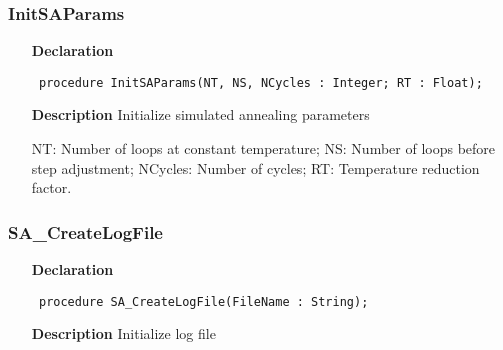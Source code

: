 \documentclass[12pt,a4paper,oneside]{report}
\newcommand{\declarationitem}[1]{\textbf{#1}}
\newcommand{\descriptiontitle}[1]{\textbf{#1}}
\newcommand{\code}[1]{\texttt{#1}}
\begin{document}
\subsubsection{InitSAParams}
\label{usimann-InitSAParams}
\begin{itemize}\item[\declarationitem{Declaration}\hfill]
	\begin{flushleft}
		\code{
			procedure InitSAParams(NT, NS, NCycles : Integer; RT : Float);}
		
	\end{flushleft}
	
	\par
	\item[\descriptiontitle{Description}]
	Initialize simulated annealing parameters
	
	NT: Number of loops at constant temperature; NS: Number of loops before step adjustment; NCycles: Number of cycles; RT: Temperature reduction factor.
	
\end{itemize}
\subsubsection{SA{\_}CreateLogFile}
\label{usimann-SA_CreateLogFile}
\begin{itemize}\item[\declarationitem{Declaration}\hfill]
	\begin{flushleft}
		\code{
			procedure SA{\_}CreateLogFile(FileName : String);}
		
	\end{flushleft}
	
	\par
	\item[\descriptiontitle{Description}]
	Initialize log file
	
\end{itemize}
\end{document}
